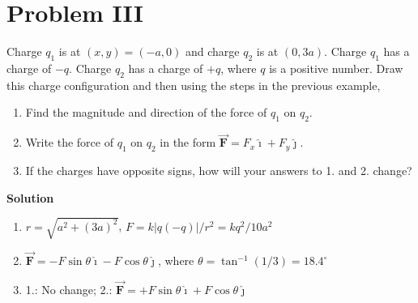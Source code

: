 \documentclass{article}
\newcommand{\ihat}[0]{\hat{\boldsymbol{\imath}}}
\newcommand{\jhat}[0]{\hat{\boldsymbol{\jmath}}}
\newcommand{\bfvec}[1]{\vec{\mathbf{#1}}}
\begin{document}
\section{Problem III}

Charge $q_1$ is at $(x,y)=(-a,0)$ and charge $q_2$ is at $(0, 3a)$. Charge $q_1$ has a charge of $-q$. Charge $q_2$ has a charge of $+q$, where $q$ is a positive number. Draw this charge configuration and then using the steps in the previous example,

\begin{enumerate}

  \item Find the magnitude and direction of the force of $q_1$ on $q_2$.

  \item Write the force of $q_1$ on $q_2$ in the form $\bfvec{F}=F_x\ihat + F_y\jhat$.

  \item If the charges have opposite signs, how will your answers to 1. and 2. change?

\end{enumerate}



\ifsolutions
{\bf Solution}

    \begin{enumerate}

      \item $r=\sqrt{a^2+(3a)^2}$, $F=k|q(-q)|/r^2=kq^2/10a^2$

      \item $\bfvec{F}=-F\sin\theta\ihat - F\cos\theta\jhat$, where $\theta=\tan^{-1}(1/3)=18.4^\circ$

      \item 1.: No change; 2.: $\bfvec{F}=+F\sin\theta\ihat + F\cos\theta\jhat$

    \end{enumerate}
\fi
\end{document}
